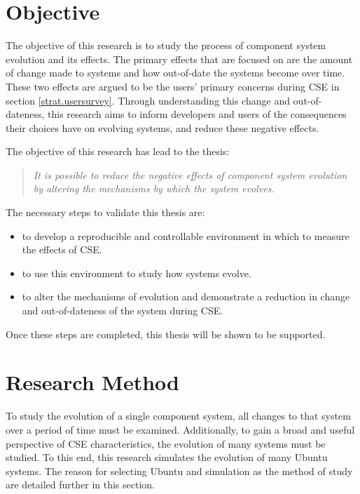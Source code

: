 \section{Objective}
The objective of this research is to study the process of component system evolution and its effects.
The primary effects that are focused on are the amount of change made to systems and how out-of-date the systems become over time.
These two effects are argued to be the users' primary concerns during CSE in section \ref{strat.usersurvey}.
Through understanding this change and out-of-dateness,
this research aims to inform developers and users of the consequences their choices have on evolving systems,
and reduce these negative effects.

The objective of this research has lead to the thesis:
\begin{quote}
\textit{It is possible to reduce the negative effects of component system evolution by altering the mechanisms by which the system evolves.} 
\end{quote}

The necessary steps to validate this thesis are:
\begin{itemize}
  \item to develop a reproducible and controllable environment in which to measure the effects of CSE.
  \item to use this environment to study how systems evolve.
  \item to alter the mechanisms of evolution and demonstrate a reduction in change and out-of-dateness of the system during CSE.
\end{itemize}

Once these steps are completed, this thesis will be shown to be supported.  

\section{Research Method}
To study the evolution of a single component system, all changes to that system over a period of time must be examined.
Additionally, to gain a broad and useful perspective of CSE characteristics, the evolution of many systems must be studied.
To this end, this research simulates the evolution of many Ubuntu systems.
The reason for selecting Ubuntu and simulation as the method of study are detailed further in this section.

